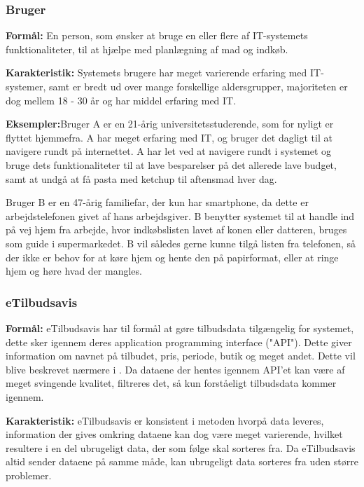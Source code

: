 \subsubsection*{Bruger}

\textbf{Formål:} En person, som ønsker at bruge en eller flere af IT-systemets funktionaliteter, til at hjælpe med planlægning af mad og indkøb.

\textbf{Karakteristik:} Systemets brugere har meget varierende erfaring med IT-systemer, samt er bredt ud over mange forskellige aldersgrupper, majoriteten er dog mellem 18 - 30 år og har middel erfaring med IT.

\textbf{Eksempler:}Bruger A er en 21-årig universitetsstuderende, som for nyligt er flyttet hjemmefra. A har meget erfaring med IT, og bruger det dagligt til at navigere rundt på internettet.
A har let ved at navigere rundt i systemet og bruge dets funktionaliteter til at lave besparelser på det allerede lave budget, samt at undgå at få pasta med ketchup til aftensmad hver dag.

Bruger B er en 47-årig familiefar, der kun har smartphone, da dette er arbejdstelefonen givet af hans arbejdsgiver.
B benytter systemet til at handle ind på vej hjem fra arbejde, hvor indkøbslisten lavet af konen eller datteren, bruges som guide i supermarkedet.
B vil således gerne kunne tilgå listen fra telefonen, så der ikke er behov for at køre hjem og hente den på papirformat, eller at ringe hjem og høre hvad der mangles.

\subsubsection*{eTilbudsavis}

\textbf{Formål:} eTilbudsavis har til formål at gøre tilbudsdata tilgængelig for systemet, dette sker igennem deres application programming interface ("API"). 
Dette giver information om navnet på tilbudet, pris, periode, butik og meget andet. 
Dette vil blive beskrevet nærmere i .
Da dataene der hentes igennem API'et kan være af meget svingende kvalitet, filtreres det, så kun forståeligt tilbudsdata kommer igennem.

\textbf{Karakteristik:} eTilbudsavis er konsistent i metoden hvorpå data leveres, information der gives omkring dataene kan dog være meget varierende, hvilket resultere i en del ubrugeligt data, der som følge skal sorteres fra.
Da eTilbudsavis altid sender dataene på samme måde, kan ubrugeligt data sorteres fra uden større problemer. 

